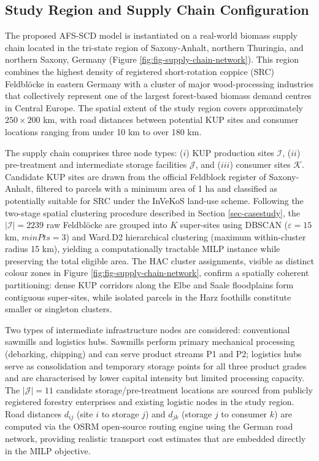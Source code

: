 \documentclass[preprint,review,1p,authoryear]{elsarticle} %
\begin{document}
\subsection{Study Region and Supply Chain Configuration}\label{study-region-and-supply-chain-configuration}

The proposed AFS-SCD model is instantiated on a real-world biomass
supply chain located in the tri-state region of Saxony-Anhalt, northern
Thuringia, and northern Saxony, Germany (Figure
\ref{fig:fig-supply-chain-network}). This region combines the highest
density of registered short-rotation coppice (SRC) Feldblöcke in eastern
Germany with a cluster of major wood-processing industries that
collectively represent one of the largest forest-based biomass demand
centres in Central Europe. The spatial extent of the study region covers
approximately \(250 \times 200\) km, with road distances between potential
KUP sites and consumer locations ranging from under 10 km to over 180
km.

The supply chain comprises three node types: (\(i\)) KUP production sites
\(\mathcal{I}\), (\(ii\)) pre-treatment and intermediate storage facilities
\(\mathcal{J}\), and (\(iii\)) consumer sites \(\mathcal{K}\). Candidate KUP
sites are drawn from the official Feldblock register of Saxony-Anhalt,
filtered to parcels with a minimum area of 1 ha and classified as
potentially suitable for SRC under the InVeKoS land-use scheme.
Following the two-stage spatial clustering procedure described in
Section \ref{sec-casestudy}, the
\(|\mathcal{I}| = 2239\) raw Feldblöcke are
grouped into \(K\) super-sites using DBSCAN (\(\varepsilon = 15\) km,
\(\mathit{minPts} = 3\)) and Ward.D2 hierarchical clustering (maximum
within-cluster radius 15 km), yielding a computationally tractable MILP
instance while preserving the total eligible area. The HAC cluster
assignments, visible as distinct colour zones in Figure
\ref{fig:fig-supply-chain-network}, confirm a spatially coherent
partitioning: dense KUP corridors along the Elbe and Saale floodplains
form contiguous super-sites, while isolated parcels in the Harz
foothills constitute smaller or singleton clusters.

Two types of intermediate infrastructure nodes are considered:
conventional sawmills and logistics hubs. Sawmills perform primary
mechanical processing (debarking, chipping) and can serve product
streams P1 and P2; logistics hubs serve as consolidation and temporary
storage points for all three product grades and are characterised by
lower capital intensity but limited processing capacity. The
\(|\mathcal{J}| = 11\) candidate
storage/pre-treatment locations are sourced from publicly registered
forestry enterprises and existing logistic nodes in the study region.
Road distances \(d_{ij}\) (site \(i\) to storage \(j\)) and \(d_{jk}\) (storage
\(j\) to consumer \(k\)) are computed via the OSRM open-source routing
engine using the German road network, providing realistic transport cost
estimates that are embedded directly in the MILP objective.
\end{document}

